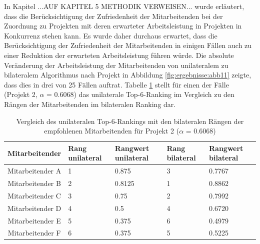 In Kapitel ...AUF KAPITEL 5 METHODIK VERWEISEN...  wurde erläutert, dass die Berücksichtigung der Zufriedenheit der Mitarbeitenden bei der Zuordnung zu Projekten mit deren erwarteter Arbeitsleistung in Projekten in Konkurrenz stehen kann.
Es wurde daher durchaus erwartet, dass die Berücksichtigung der Zufriedenheit der Mitarbeitenden in einigen Fällen auch zu einer Reduktion der erwarteten Arbeitsleistung führen würde.
Die absolute Veränderung der Arbeitsleistung der Mitarbeitenden von unilateralem zu bilateralem Algorithmus nach Projekt in Abbildung \ref{fig:ergebnisse:abb11} zeigte, dass dies in drei von 25 Fällen auftrat.
Tabelle \ref{tab:diskussion:tab2} stellt für einen der Fälle (Projekt 2, $\alpha$ = 0.6068) das unilaterale Top-6-Ranking im Vergleich zu den Rängen der Mitarbeitenden im bilateralen Ranking dar.

\begin{table}[htbp]
    \begin{center}
    \begin{tabular}{c|p{0.7in}|p{0.7in}|p{0.7in}|p{0.7in}}
    {\textbf{Mitarbeitender}} & {\textbf{Rang unilateral}} & {\textbf{Rangwert unilateral}} & {\textbf{Rang bilateral}} & {\textbf{Rangwert bilateral}} \\
    \hline
	Mitarbeitender A & \hfil1 & \hfil0.875 & \hfil3 & \hfil0.7767 \\
    \hline
    Mitarbeitender B & \hfil2 & \hfil0.8125 & \hfil1 & \hfil0.8862 \\
    \hline
	Mitarbeitender C & \hfil3 & \hfil0.75 & \hfil2 & \hfil0.7992 \\
    \hline
	Mitarbeitender D & \hfil4 & \hfil0.5 & \hfil4 & \hfil0.6720 \\
    \hline
	Mitarbeitender E & \hfil5 & \hfil0.375 & \hfil6 & \hfil0.4979 \\
    \hline
	Mitarbeitender F & \hfil6 & \hfil0.375 & \hfil5 & \hfil0.5225 \\
    \end{tabular}
    \end{center}
    \caption[Vergleich des unilateralen Top-6-Rankings mit den bilateralen Rängen der empfohlenen Mitarbeitenden für Projekt 2 ($\alpha$ = 0.6068)]{Vergleich des unilateralen Top-6-Rankings mit den bilateralen Rängen der empfohlenen Mitarbeitenden für Projekt 2 ($\alpha$ = 0.6068)}
	\label{tab:diskussion:tab2}
\end{table}

